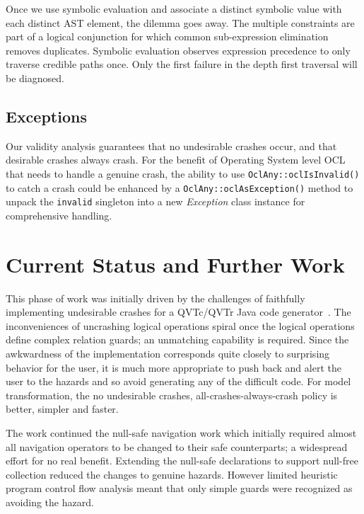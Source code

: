 \documentclass[
]{ceurart}
\begin{document}

Once we use symbolic evaluation and associate a distinct symbolic value with each distinct AST element, the dilemma goes away. The multiple constraints are part of a logical conjunction for which common sub-expression elimination removes duplicates. Symbolic evaluation observes expression precedence to only traverse credible paths once. Only the first failure in the depth first traversal will be diagnosed.


\subsection{Exceptions}

Our validity analysis guarantees that no undesirable crashes occur, and that desirable crashes always crash. For the benefit of Operating System level OCL that needs to handle a genuine crash, the ability to use \verb|OclAny::oclIsInvalid()| to catch a crash could be enhanced by a \verb|OclAny::oclAsException()| method to unpack the \verb|invalid| singleton into a new \emph{Exception} class instance for comprehensive handling.

\section{Current Status and Further Work}\label{Current Status and Further Work}

This phase of work was initially driven by the challenges of faithfully implementing undesirable crashes for a QVTc/QVTr Java code generator~\cite{Eclipse-QVTd}. The inconveniences of uncrashing logical operations spiral once the logical operations define complex relation guards; an unmatching capability is required. Since the awkwardness of the implementation corresponds quite closely to surprising behavior for the user, it is much more appropriate to push back and alert the user to the hazards and so avoid generating any of the difficult code. For model transformation, the no undesirable crashes, all-crashes-always-crash policy is better, simpler and faster.

The work continued the null-safe navigation work \cite{Safe OCL} which initially required almost all navigation operators to be changed to their safe counterparts; a widespread effort for no real benefit. Extending the null-safe declarations to support null-free collection reduced the changes to genuine hazards. However limited heuristic program control flow analysis meant that only simple guards were recognized as avoiding the hazard.
\end{document}
